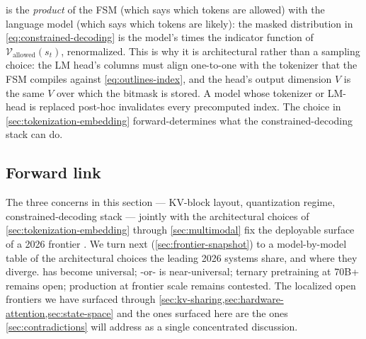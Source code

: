 \begin{analogy}
 is the \emph{product} of the FSM (which says
which tokens are allowed) with the language model (which says which
tokens are likely): the masked distribution in
\cref{eq:constrained-decoding} is the model's  times the
indicator function of $\mathcal{V}_{\text{allowed}}(s_t)$,
renormalized. This is why it is architectural rather than a sampling
choice: the LM head's columns must align one-to-one with the tokenizer
that the FSM compiles against \cref{eq:outlines-index}, and the head's
output dimension $V$ is the same $V$ over which the bitmask is stored.
A model whose tokenizer or LM-head is replaced post-hoc invalidates
every precomputed index. The choice in
\cref{sec:tokenization-embedding} forward-determines what the
constrained-decoding stack can do.
\end{analogy}

\subsection{Forward link}

The three concerns in this section --- KV-block layout, quantization
regime, constrained-decoding stack --- jointly with the architectural
choices of \cref{sec:tokenization-embedding} through
\cref{sec:multimodal} fix the deployable surface of a 2026 frontier
. We turn next (\cref{sec:frontier-snapshot}) to a model-by-model
table of the architectural choices the leading 2026 systems share, and
where they diverge.  has become universal; -or- is
near-universal; ternary pretraining at 70B+ remains open; 
production at frontier scale remains contested. The localized open
frontiers we have surfaced through \cref{sec:kv-sharing,sec:hardware-attention,sec:state-space}
and the ones surfaced here are the ones \cref{sec:contradictions} will
address as a single concentrated discussion.
